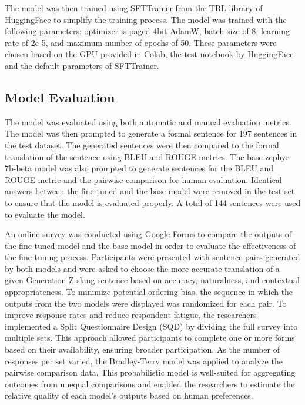 The model was then trained using SFTTrainer from the TRL library of HuggingFace to simplify the training process. The model was trained with the following parameters: optimizer is paged 4bit AdamW, batch size of 8, learning rate of 2e-5, and maximum number of epochs of 50. These parameters were chosen based on the GPU provided in Colab, the test notebook by HuggingFace and the default parameters of SFTTrainer.

\subsection{Model Evaluation}
The model was evaluated using both automatic and manual evaluation metrics. The model was then prompted to generate a formal sentence for 197 sentences in the test dataset. The generated sentences were then compared to the formal translation of the sentence using BLEU and ROUGE metrics. The base zephyr-7b-beta model was also prompted to generate sentences for the BLEU and ROUGE metric and the pairwise comparison for human evaluation. Identical answers between the fine-tuned and the base model were removed in the test set to ensure that the model is evaluated properly. A total of 144 sentences were used to evaluate the model. %

An online survey was conducted using Google Forms to compare the outputs of the fine-tuned model and the base model in order to evaluate the effectiveness of the fine-tuning process. Participants were presented with sentence pairs generated by both models and were asked to choose the more accurate translation of a given Generation Z slang sentence based on accuracy, naturalness, and contextual appropriateness. To minimize potential ordering bias, the sequence in which the outputs from the two models were displayed was randomized for each pair. To improve response rates and reduce respondent fatigue, the researchers implemented a Split Questionnaire Design (SQD) by dividing the full survey into multiple sets. This approach allowed participants to complete one or more forms based on their availability, ensuring broader participation. As the number of responses per set varied, the Bradley-Terry model was applied to analyze the pairwise comparison data. This probabilistic model is well-suited for aggregating outcomes from unequal comparisons and enabled the researchers to estimate the relative quality of each model’s outputs based on human preferences.
